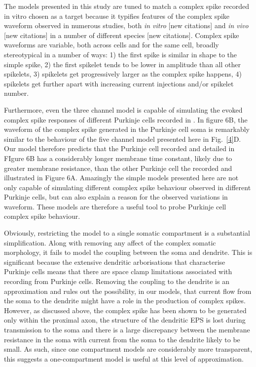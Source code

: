 \documentclass[utf8]{frontiersSCNS} %
\begin{document}
The models presented in this study are tuned to match a complex spike
recorded in vitro \cite{DavieEtAl2008} chosen as a target because it
typifies features of the complex spike waveform observed in numerous
studies, both \textsl{in vitro} [new citations] and \textsl{in vivo}
[new citations] in a number of different species [new
  citations]. Complex spike waveforms are variable, both across cells and for the same cell, 
broadly stereotypical in a number of ways: 1) the first spike is
similar in shape to the simple spike, 2) the first spikelet tends to
be lower in amplitude than all other spikelets, 3) spikelets get
progressively larger as the complex spike happens, 4) spikelets get
further apart with increasing current injections and/or spikelet
number.

Furthermore, even the three channel model is capable of
simulating the evoked complex spike responses of different Purkinje
cells recorded in \cite{MonsivaisEtAl2005}. In figure 6B, the waveform
of the complex spike generated in the Purkinje cell soma is remarkably
similar to the behaviour of the five channel model presented here in
Fig.~\ref{4}D. Our model therefore predicts that the Purkinje cell
recorded \cite{MonsivaisEtAl2005} and detailed in FIgure 6B has a
considerably longer membrane time constant, likely due to greater
membrane resistance, than the other Purkinje cell the recorded and
illustrated in Figure 6A. Amazingly the simple models presented here
are not only capable of simulating different complex spike behaviour
observed in different Purkinje cells, but can also explain a reason
for the observed variations in waveform. These models are therefore a
useful tool to probe Purkinje cell complex spike behaviour.

Obviously, restricting the model to a single somatic compartment is a substantial simplification. Along with removing any affect of the complex somatic morphology, it fails to model the coupling between the soma and dendrite. This is significant because the extensive dendritic arborisations that characterise Purkinje cells means that there are space clamp limitations associated with recording from Purkinje cells. Removing the coupling to the dendrite is an approximation and rules out the possibility, in our models, that current flow from the soma to the dendrite might have a role in the production of complex spikes. However, as discussed above, the complex spike has been shown to be generated only within the proximal axon, the structure of the dendritic EPS is lost during transmission to the soma and there is a large discrepancy between the membrane resistance in the soma with current from the soma to the dendrite likely to be small. As such, since one compartment models are considerably more transparent, this suggests a one-compartment model is useful at this level of approximation.
\end{document}
